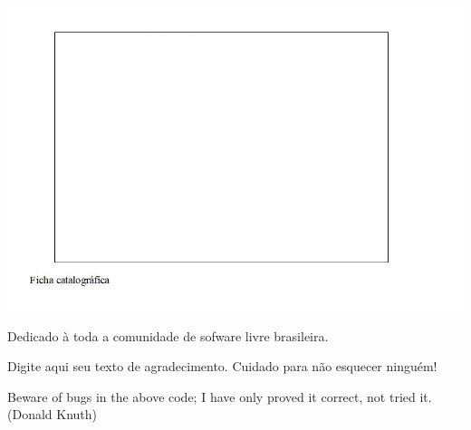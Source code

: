 \documentclass[
  12pt,
  a4paper,
  oneside,
  openright,
  sumario=abnt-6027-2012,
  english,
  brazil]{abntex2}
\author{}
\date{}
\begin{document}
\imprimircapa

\imprimirfolhaderosto*

\begin{fichacatalografica}
    \vspace*{\fill}
	\begin{flushright}
		\includegraphics[]{fichacatalografica.jpg}
	\end{flushright}
\end{fichacatalografica}





\begin{dedicatoria}
	Dedicado à toda a comunidade de sofware livre brasileira.
\end{dedicatoria}

\begin{agradecimentos}
	Digite aqui seu texto de agradecimento. Cuidado para não esquecer
ninguém!
\end{agradecimentos}

\begin{epigrafe}
	Beware of bugs in the above code; I have only proved it correct, not
tried it. (Donald Knuth)
\end{epigrafe}

\end{document}

